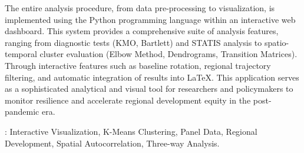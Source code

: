 \begin{singlespace}
The entire analysis procedure, from data pre-processing to visualization, is implemented using the Python programming language within an interactive web dashboard. This system provides a comprehensive suite of analysis features, ranging from diagnostic tests (KMO, Bartlett) and STATIS analysis to spatio-temporal cluster evaluation (Elbow Method, Dendrograms, Transition Matrices). Through interactive features such as baseline rotation, regional trajectory filtering, and automatic integration of results into LaTeX. This application serves as a sophisticated analytical and visual tool for researchers and policymakers to monitor resilience and accelerate regional development equity in the post-pandemic era.

\vspace*{0.2cm}

\noindent {}:
	Interactive Visualization, K-Means Clustering, Panel Data, Regional Development, Spatial Autocorrelation, Three-way Analysis. %
\end{singlespace}

\newpage 